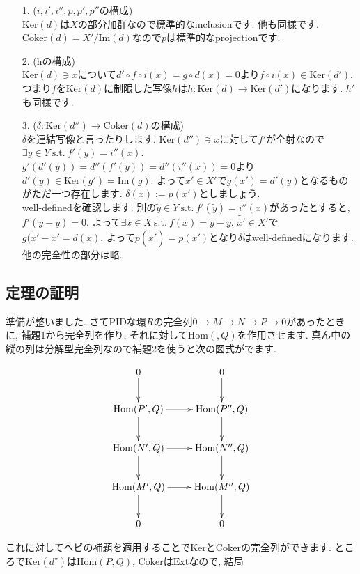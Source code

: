 \documentclass{jsarticle}
\def\Im{\mathrm{Im}}
\def\Ker{\mathrm{Ker}}
\def\Hom{\mathrm{Hom}}
\def\Ext{\mathrm{Ext}}
\def\Coker{\mathrm{Coker}}
\def\suchthat{\mathrm{\ s.t.\ }}
\theoremstyle{definition}
\numberwithin{theorem}{section}
\begin{document}
\begin{itemize}
\item[1.] ($i, i', i'', p, p', p''$の構成)\\
$\Ker(d)$は$X$の部分加群なので標準的なinclusionです. 他も同様です. $\Coker(d) = X'/\Im(d)$なので$p$は標準的なprojectionです.

\item[2.] (hの構成)\\
$\Ker(d)\ni x$について$d'\circ f\circ i(x) = g\circ d(x) = 0$より$f\circ i(x) \in \Ker(d')$. つまり$f$を$\Ker(d)$に制限した写像$h$は$h : \Ker(d) \rightarrow \Ker(d')$になります. $h'$も同様です. 

\item[3.] ($\delta: \Ker(d'') \rightarrow \Coker(d)$の構成)\\
$\delta$を連結写像と言ったりします. $\Ker(d'') \ni x$に対して$f'$が全射なので$\exists y \in Y \suchthat f'(y) = i''(x)$. $g'(d'(y)) = d''(f'(y)) = d''(i''(x)) = 0$より$d'(y) \in \Ker(g') = \Im(g)$. よって$x' \in X'$で$g(x') = d'(y)$となるものがただ一つ存在します. $\delta(x) := p(x')$としましょう. \\
well-definedを確認します. 別の$\tilde{y} \in Y \suchthat f'(\tilde{y}) = i''(x)$があったとすると, $f'(\tilde{y} - y) = 0$. よって$\exists x \in X \suchthat f(x) = \tilde{y} - y$. $\tilde{x'} \in X'$で$g(\tilde{x'} - x' = d(x)$. よって$p(\tilde{x'}) = p(x')$となり$\delta$はwell-definedになります. 他の完全性の部分は略.
\end{itemize}

\subsection{定理の証明}
準備が整いました. さてPIDな環$R$の完全列$0 \rightarrow M \rightarrow N \rightarrow P \rightarrow 0$があったときに, 補題1から完全列を作り, それに対して$\Hom(, Q)$を作用させます. 真ん中の縦の列は分解型完全列なので補題2を使うと次の図式がでます.

\begin{equation*}
\xymatrix{
0 \ar[d] & 0 \ar[d]\\
\Hom(P', Q) \ar[r] \ar[d] & \Hom(P'', Q) \ar[d]\\
\Hom(N', Q) \ar[r] \ar[d] & \Hom(N'', Q) \ar[d]\\
\Hom(M', Q) \ar[r] \ar[d] & \Hom(M'', Q) \ar[d]\\
0 & 0\\
}
\end{equation*}

これに対してヘビの補題を適用することで$\Ker$と$\Coker$の完全列ができます. ところで$\Ker(d^\star)$は$\Hom(P, Q)$, $\Coker$は$\Ext$なので, 結局
\end{document}
